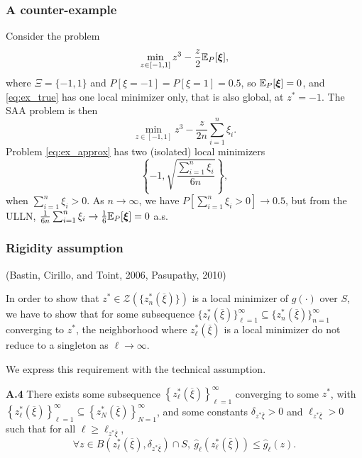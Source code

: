 \documentclass{beamer}
\def\bxi{\boldsymbol\xi}
\begin{document}
\begin{frame}
\frametitle{A counter-example}

Consider the problem
\begin{equation}\label{eq:ex_true}
\min_{z \in [-1, 1]} z^3 - \frac{z}{2}\EE_P[\bxi],
\end{equation}
where $\Xi = \lbrace -1, 1\rbrace$ and $P[\xi = -1] = P[\xi = 1] = 0.5$, so $\EE_P[\bxi] = 0$, and \eqref{eq:ex_true} has one local minimizer only, that is also global, at $z^* = -1$.
The SAA problem is then
\begin{equation}\label{eq:ex_approx}
\min_{z \in [-1, 1]} z^3 - \frac{z}{2n}\sum_{i = 1}^n \xi_i.
\end{equation}
Problem \eqref{eq:ex_approx} has two (isolated) local minimizers
\[
\left\lbrace -1, \sqrt{\frac{\sum_{i=1}^n \xi_i}{6n}}\right\rbrace,
\]
when $\sum_{i=1}^n \xi_i > 0$.
As $n \rightarrow \infty$, we have $P\left[\sum_{i=1}^n \xi_i > 0\right] \rightarrow 0.5$, but from the ULLN, $\frac{1}{6n}\sum_{i=1}^n \xi_i \rightarrow \frac{1}{6}\EE_P[\bxi] = 0$ a.s.

\end{frame}

\begin{frame}
\frametitle{Rigidity assumption}

(Bastin, Cirillo, and Toint, 2006, Pasupathy, 2010)


In order to show that $z^* \in \mathcal{Z}\left(\lbrace z^*_n(\overline{\xi})\rbrace\right)$ is a local minimizer of $g(\cdot)$ over $S$, 
we have to show that for some subsequence $\lbrace z^*_{\ell} (\overline{\xi}) \rbrace_{\ell = 1}^{\infty} \subseteq \lbrace z^*_{n} (\overline{\xi}) \rbrace_{n = 1}^{\infty}$ converging to $z^*$, the neighborhood where $z_{\ell}^*(\overline{\xi})$ is a local minimizer do not reduce to a singleton as $\ell \rightarrow \infty$.

\mbox{}

We express this requirement with the technical assumption.

\noindent
\textbf{A.4}
There exists some subsequence $\left\lbrace z^*_{\ell} (\overline{\xi}) \right\rbrace_{\ell = 1}^{\infty}$ converging to some $z^*$, with $\left\lbrace z^*_{\ell} (\overline{\xi}) \right\rbrace_{\ell = 1}^{\infty} \subseteq \left\lbrace z^*_{N} (\overline{\xi}) \right\rbrace_{N = 1}^{\infty}$, and some constants $\delta_{z^*\overline{\xi}} >0$ and $\ell_{z^* \overline{\xi}} > 0$ such that for all $\ell \geq \ell_{ z^* \overline{\xi}}$,
\[
\forall z \in B\left( z_{\ell}^*(\overline{\xi}), \delta_{z^*
  \overline{\xi}} \right) \cap S, \  \hat{g}_{\ell} \left(
  z_{\ell}^*(\overline{\xi}) \right) \leq \hat{g}_{\ell}(z).
\]


\end{frame}
\end{document}
